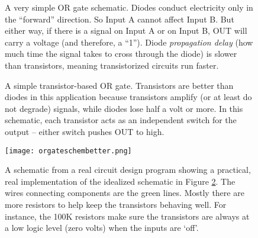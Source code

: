 \begin{figure}[h!]
\begin{center}

\caption{A very simple OR gate schematic. Diodes conduct electricity only in the ``forward'' direction. So Input A cannot affect Input B. But either way, if there is a signal on Input A or on Input B, OUT will carry a voltage (and therefore, a ``1''). Diode \emph{propagation delay} (how much time the signal takes to cross through the diode) is slower than transistors, meaning transistorized circuits run faster.}
\label{fig:diodeorgate}
\end{center}
\end{figure}


\begin{figure}[h!]
\begin{center}

\caption{A simple transistor-based OR gate. Transistors are better than diodes in this application because transistors amplify (or at least do not degrade) signals, while diodes lose half a volt or more.  In this schematic, each transistor acts as an independent switch for the output -- either switch pushes OUT to high.}
\label{fig:npnorgate}
\end{center}
\end{figure}

\begin{figure}[h!]
\begin{center}
\texttt{[image: orgateschembetter.png]}
\caption{A schematic from a real circuit design program showing a practical, real implementation of the idealized schematic in Figure \ref{fig:npnorgate}. The wires connecting components are the green lines. Mostly there are more resistors to help keep the transistors behaving well. For instance, the 100K resistors make sure the transistors are always at a low logic level (zero volts) when the inputs are `off'.}
\label{fig:orgateeagleschematic}
\end{center}
\end{figure}





